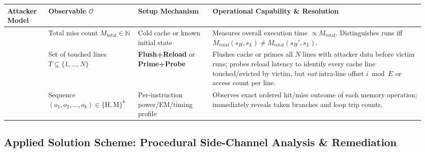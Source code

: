 \begin{table}[h!]
\centering
\footnotesize
\begin{tabularx}{\textwidth}{@{}L{2.3cm} L{3.6cm} L{3.3cm} Y@{}}
\toprule
\textbf{Attacker Model} & \textbf{Observable $\mathcal{O}$} & \textbf{Setup Mechanism} & \textbf{Operational Capability \& Resolution} \\
\midrule
{} & Total miss count $M_{\text{total}} \in \mathbb{N}$ & Cold cache or known initial state & Measures overall execution time $\propto M_{\text{total}}$. Distinguishes runs iff $M_{\text{total}}(s_H, s_L) \neq M_{\text{total}}(s_H', s_L)$. \\
 & Set of touched lines $T \subseteq \{1,\dots,N\}$ & \textbf{Flush+Reload} or \textbf{Prime+Probe} & Flushes cache or primes all $N$ lines with attacker data before victim runs; probes reload latency to identify every cache line touched/evicted by victim, but \emph{not} intra-line offset $i \bmod E$ or access count per line. \\
 & Sequence $(o_1, o_2, \dots, o_k) \in \{\text{H},\text{M}\}^k$ & Per-instruction power/EM/timing profile & Observes exact ordered hit/miss outcome of each memory operation; immediately reveals taken branches and loop trip counts. \\
\bottomrule
\end{tabularx}
\end{table}


\subsection{Applied Solution Scheme: Procedural Side-Channel Analysis \& Remediation}

